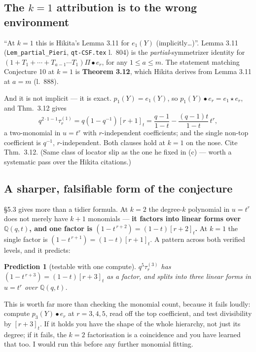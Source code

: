 \documentclass[11pt]{article}
\newtheorem{prediction}{Prediction}
\begin{document}
\subsection{The $k=1$ attribution is to the wrong environment}
``At $k=1$ this is Hikita's Lemma 3.11 for $e_1(Y)$ (implicitly\dots)''. Lemma 3.11
(\texttt{Lem\_partial\_Pieri}, \texttt{qt-CSF.tex} l.~804) is the \emph{partial}-symmetrizer
identity for $(1+T_1+\cdots+T_{a-1}\cdots T_1)\Pi\bullet e_r$, for any $1\le a\le m$. The
statement matching Conjecture 10 at $k=1$ is \textbf{Theorem 3.12}, which Hikita derives from
Lemma 3.11 at $a=m$ (l.~888).

And it is not implicit --- it is exact. $p_1(Y)=e_1(Y)$, so $p_1(Y)\bullet e_r=e_1\star e_r$,
and Thm.\ 3.12 gives
\[q^{2\cdot1-1}\tau^{(1)}_r=q(1-q^{-1})[r+1]_t=\frac{q-1}{1-t}-\frac{(q-1)t}{1-t}\,t^{r},\]
a two-monomial in $u=t^r$ with $r$-independent coefficients; and the single non-top
coefficient is $q^{-1}$, $r$-independent. Both clauses hold at $k=1$ on the nose. Cite
Thm.\ 3.12. (Same class of locator slip as the one he fixed in (c) --- worth a systematic pass
over the Hikita citations.)

\subsection{A sharper, falsifiable form of the conjecture}
\S5.3 gives more than a tidier formula. At $k=2$ the degree-$k$ polynomial in $u=t^r$ does not
merely have $k+1$ monomials --- \textbf{it factors into linear forms over $\mathbb{Q}(q,t)$,
and one factor is $(1-t^{\,r+2})=(1-t)[r+2]_t$.} At $k=1$ the single factor is
$(1-t^{\,r+1})=(1-t)[r+1]_t$. A pattern across both verified levels, and it predicts:

\begin{prediction}[testable with one compute]
$q^{5}\tau^{(3)}_r$ has $(1-t^{\,r+3})=(1-t)[r+3]_t$ as a factor, and splits into three linear
forms in $u=t^r$ over $\mathbb{Q}(q,t)$.
\end{prediction}

This is worth far more than checking the monomial count, because it fails loudly: compute
$p_3(Y)\bullet e_r$ at $r=3,4,5$, read off the top coefficient, and test divisibility by
$[r+3]_t$. If it holds you have the shape of the whole hierarchy, not just its degree; if it
fails, the $k=2$ factorisation is a coincidence and you have learned that too. I would run this
before any further monomial fitting.
\end{document}
